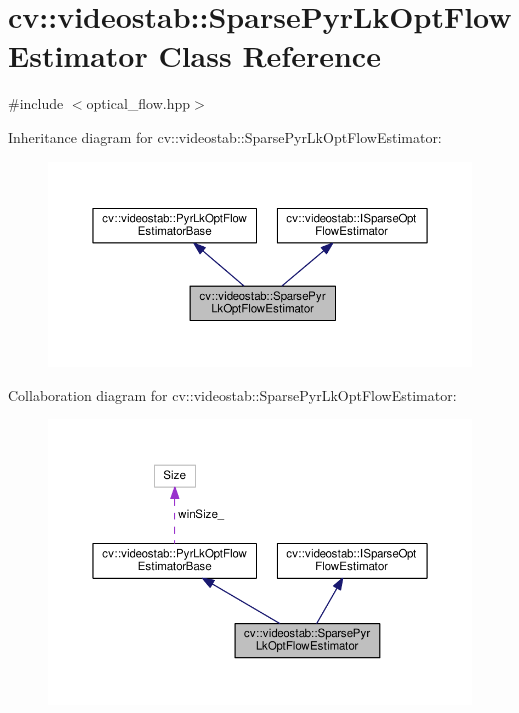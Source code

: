 \hypertarget{classcv_1_1videostab_1_1SparsePyrLkOptFlowEstimator}{\section{cv\-:\-:videostab\-:\-:Sparse\-Pyr\-Lk\-Opt\-Flow\-Estimator Class Reference}
\label{classcv_1_1videostab_1_1SparsePyrLkOptFlowEstimator}
}


{\ttfamily \#include $<$optical\-\_\-flow.\-hpp$>$}



Inheritance diagram for cv\-:\-:videostab\-:\-:Sparse\-Pyr\-Lk\-Opt\-Flow\-Estimator\-:\nopagebreak
\begin{figure}[H]
\begin{center}
\leavevmode
\includegraphics[width=350pt]{classcv_1_1videostab_1_1SparsePyrLkOptFlowEstimator__inherit__graph}
\end{center}
\end{figure}


Collaboration diagram for cv\-:\-:videostab\-:\-:Sparse\-Pyr\-Lk\-Opt\-Flow\-Estimator\-:\nopagebreak
\begin{figure}[H]
\begin{center}
\leavevmode
\includegraphics[width=350pt]{classcv_1_1videostab_1_1SparsePyrLkOptFlowEstimator__coll__graph}
\end{center}
\end{figure}
